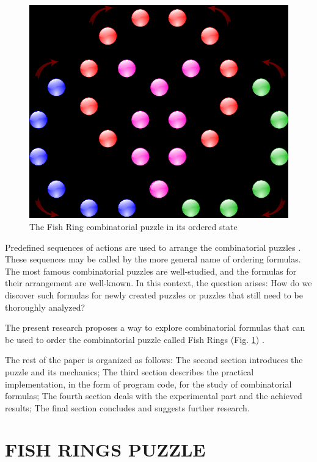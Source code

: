 \documentclass[a4paper,twocolumn,10pt]{article}
\begin{document}
\begin{figure}
	\centering
	\includegraphics[width=1.0\linewidth]{figure01.png}
	\caption{The Fish Ring combinatorial puzzle in its ordered state}
	\label{figure01}
\end{figure}

Predefined sequences of actions are used to arrange the combinatorial puzzles \cite{8718565}. These sequences may be called by the more general name of ordering formulas. The most famous combinatorial puzzles are well-studied, and the formulas for their arrangement are well-known. In this context, the question arises: How do we discover such formulas for newly created puzzles or puzzles that still need to be thoroughly analyzed?

The present research proposes a way to explore combinatorial formulas that can be used to order the combinatorial puzzle called Fish Rings (Fig. \ref{figure01}) \cite{Balabanov2015}.

The rest of the paper is organized as follows: The second section introduces the puzzle and its mechanics; The third section describes the practical implementation, in the form of program code, for the study of combinatorial formulas; The fourth section deals with the experimental part and the achieved results; The final section concludes and suggests further research.

\section{FISH RINGS PUZZLE}
\end{document}
